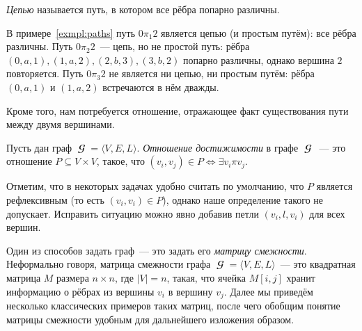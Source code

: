 \begin{definition}[Цепь]
    \label{def:trail}
    \emph{Цепью} называется путь, в котором все рёбра попарно различны.
\end{definition}

\begin{example}
    В примере~\ref{exmpl:paths} путь $0 \pi_1 2$ является цепью (и простым путём): все рёбра различны.
    Путь $0 \pi_2 2$~--- цепь, но не простой путь: рёбра $(0,a,1), (1,a,2), (2,b,3), (3,b,2)$ попарно различны, однако вершина $2$ повторяется.
    Путь $0 \pi_3 2$ не является ни цепью, ни простым путём: рёбра $(0,a,1)$ и $(1,a,2)$ встречаются в нём дважды.
\end{example}

Кроме того, нам потребуется отношение, отражающее факт существования пути между двумя вершинами.

\begin{definition}
    \label{def:reach}
    Пусть дан граф $\mbfscrG = \langle V, E, L \rangle$. \emph{Отношение достижимости} в графе $\mbfscrG$~--- это отношение $P \subseteq V \times V$, такое, что $(v_i,v_j) \in P \iff \exists v_i \pi v_j$.
\end{definition}


Отметим, что в некоторых задачах удобно считать по умолчанию, что $P$ является рефлексивным%
%
(то есть $(v_i,v_i) \in P$), однако наше определение такого не допускает.
Исправить ситуацию можно явно добавив петли $(v_i,l,v_i)$ для всех вершин.

Один из способов задать граф~--- это задать его \emph{матрицу смежности}.
Неформально говоря, матрица смежности графа $\mbfscrG = \langle V, E, L \rangle$~--- это квадратная матрица $M$ размера $n \times n$, где $|V| = n$,
такая, что ячейка $M[i,j]$ хранит информацию о рёбрах из вершины $v_i$ в вершину $v_j$.
Далее мы приведём несколько классических примеров таких матриц, после чего обобщим понятие матрицы смежности удобным для дальнейшего изложения образом.

